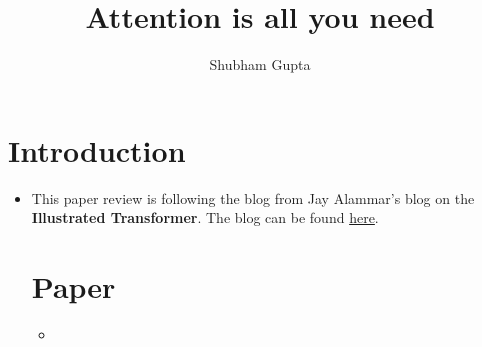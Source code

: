 \documentclass[a4paper]{article}
\title{Attention is all you need}
\author{Shubham Gupta}
\begin{document}
\maketitle
\section{Introduction}
\begin{itemize}
    \item This paper review is following the blog from Jay Alammar's blog on the \textbf{Illustrated Transformer}. The blog can be found \href{https://jalammar.github.io/illustrated-transformer/}{here}.  
\section{Paper}
\begin{itemize}
    \item 
\end{itemize}
\end{itemize}
\end{document}
